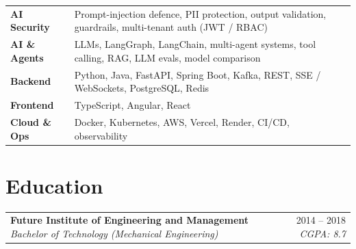 \documentclass[10pt, letterpaper]{article}
\makeatletter
\newcommand{\jobheading}[4]{%
  \noindent
  \begin{tabularx}{\textwidth}{@{}X r@{}}
    \textbf{\color{primary}#1} \textbar{} \textit{\small\color{subtle}#2} &
    \small\color{subtle}#3 \textbar{} \textit{\small #4}
  \end{tabularx}%
}
\makeatother
\begin{document}
\begin{tabularx}{\textwidth}{@{} l X @{}}
\textbf{AI Security} & Prompt-injection defence, PII protection, output validation, guardrails, multi-tenant auth (JWT / RBAC) \\[1pt]
\textbf{AI \& Agents} & LLMs, LangGraph, LangChain, multi-agent systems, tool calling, RAG, LLM evals, model comparison \\[1pt]
\textbf{Backend} & Python, Java, FastAPI, Spring Boot, Kafka, REST, SSE / WebSockets, PostgreSQL, Redis \\[1pt]
\textbf{Frontend} & TypeScript, Angular, React \\[1pt]
\textbf{Cloud \& Ops} & Docker, Kubernetes, AWS, Vercel, Render, CI/CD, observability \\
\end{tabularx}

\section{Education}

\jobheading{Future Institute of Engineering and Management}{Bachelor of Technology (Mechanical Engineering)}{2014 -- 2018}{CGPA: 8.7}
\end{document}
